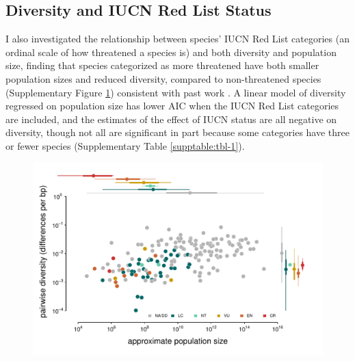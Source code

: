 \documentclass[9pt,lineno]{elife}
\begin{document}
\begin{appendixbox}
\section{Diversity and IUCN Red List Status}
\label{app:div-iucn}

I also investigated the relationship between species' IUCN Red List categories
(an ordinal scale of how threatened a species is) and both diversity and
population size, finding that species categorized as more threatened have both
smaller population sizes and reduced diversity, compared to non-threatened
species (Supplementary Figure \ref{figsupp:figure-1-redlist}) consistent with
past work \citep{Spielman2004-mt}. A linear model of diversity regressed on
population size has lower AIC when the IUCN Red List categories are included,
and the estimates of the effect of IUCN status are all negative on diversity,
though not all are significant in part because some categories have three or
fewer species (Supplementary Table \ref{supptable:tbl-1}).


\end{appendixbox}


\begin{figure}
  \includegraphics[width=\textwidth]{figures/diversity_popsize_redlist.pdf}
\label{figsupp:figure-1-redlist}
\end{figure}
\end{document}
